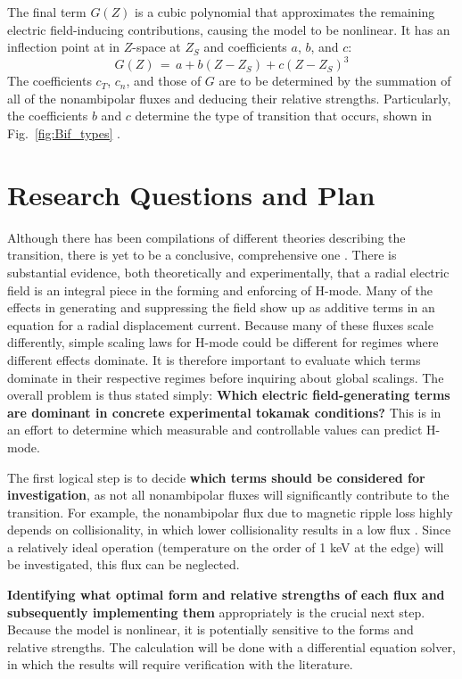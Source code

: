 \documentclass[a4paper]{article}
\begin{document}
The final term $G(Z)$ is a cubic polynomial that approximates the remaining electric field-inducing contributions, causing the model to be nonlinear.
It has an inflection point at in $Z$-space at $Z_S$ and coefficients $a$, $b$, and $c$:
\begin{equation}
	G(Z) \,=\, a + b(Z - Z_S) + c(Z - Z_S)^3
\end{equation}
The coefficients $c_T$, $c_n$, and those of $G$ are to be determined by the summation of all of the nonambipolar fluxes and deducing their relative strengths.
Particularly, the coefficients $b$ and $c$ determine the type of transition that occurs, shown in Fig.~\ref{fig:Bif_types} \cite{staps_backstepping_2017}.


\section{Research Questions and Plan}
Although there has been compilations of different theories describing the transition, there is yet to be a conclusive, comprehensive one \cite{connor_review_2000}.
There is substantial evidence, both theoretically and experimentally, that a radial electric field is an integral piece in the forming and enforcing of H-mode.
Many of the effects in generating and suppressing the field show up as additive terms in an equation for a radial displacement current.
Because many of these fluxes scale differently, simple scaling laws for H-mode could be different for regimes where different effects dominate.
It is therefore important to evaluate which terms dominate in their respective regimes before inquiring about global scalings.
The overall problem is thus stated simply: \textbf{Which electric field-generating terms are dominant in concrete experimental tokamak conditions?}
This is in an effort to determine which measurable and controllable values can predict H-mode.

The first logical step is to decide \textbf{which terms should be considered for investigation}, as not all nonambipolar fluxes will significantly contribute to the transition.
For example, the nonambipolar flux due to magnetic ripple loss highly depends on collisionality, in which lower collisionality results in a low flux \cite{stringer_ripple_1972}.
Since a relatively ideal operation (temperature on the order of 1 keV at the edge) will be investigated, this flux can be neglected.

\textbf{Identifying what optimal form and relative strengths of each flux and subsequently implementing them} appropriately is the crucial next step.
Because the model is nonlinear, it is potentially sensitive to the forms and relative strengths.
The calculation will be done with a differential equation solver, in which the results will require verification with the literature.
\end{document}
